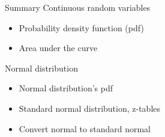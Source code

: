 \documentclass{beamer}
\newcommand{\ignore}[1]{}
\let\thefootnote\relax\footnotetext{\tiny{*  Office Hours: Wed \& Fri 10:00 - 11:30 AM, KMC 8-174}}
\begin{document}
\begin{frame}{Summary}
Continuous random variables
\begin{itemize}
\item Probability density function (pdf)
\item Area under the curve
\end{itemize}
Normal distribution
\begin{itemize}
\item Normal distribution's pdf
\item Standard normal distribution, z-tables
\item Convert normal to standard normal
\end{itemize}
\end{frame}

\ignore{
\begin{frame}{Time Series Plot}
\begin{figure}
    \caption{}
    \texttt{[image: figures/coindesk-bpi-chart]}
\end{figure}
\let\thefootnote\relax\footnotetext{\tiny{* Plot from Coindesk.com}}
\end{frame}

\begin{frame}{}
\begin{itemize}
\item 
\end{itemize}
\end{frame}

\vspace{\stretch{0.5}}

\begin{block}{}
\end{block}


}
\end{document}
